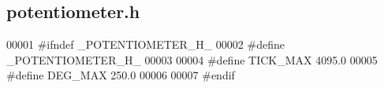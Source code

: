 \subsection{potentiometer.\+h}
\label{potentiometer_8h_source}

\begin{DoxyCode}
00001 \textcolor{preprocessor}{#ifndef \_POTENTIOMETER\_H\_}
00002 \textcolor{preprocessor}{#define \_POTENTIOMETER\_H\_}
00003 
00004 \textcolor{preprocessor}{#define TICK\_MAX 4095.0}
00005 \textcolor{preprocessor}{#define DEG\_MAX 250.0}
00006 
00007 \textcolor{preprocessor}{#endif}
\end{DoxyCode}
